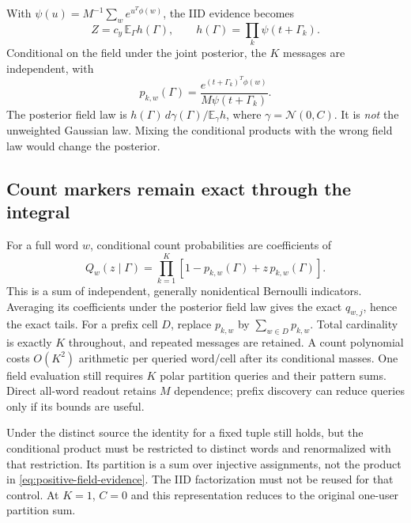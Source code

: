 \documentclass[10pt,a4paper]{article}
\newcommand{\E}{\mathbb E}
\begin{document}
With $\psi(u)=M^{-1}\sum_w e^{u^T\phi(w)}$, the IID evidence becomes
\begin{equation}
 Z=c_y\,\E_\Gamma h(\Gamma),\qquad
 h(\Gamma)=\prod_k\psi(t+\Gamma_k).
 \label{eq:positive-field-evidence}
\end{equation}
Conditional on the field under the joint posterior, the $K$ messages are independent, with
\[
 p_{k,w}(\Gamma)=\frac{e^{(t+\Gamma_k)^T\phi(w)}}{M\psi(t+\Gamma_k)}.
\]
The posterior field law is $h(\Gamma)\,d\gamma(\Gamma)/\E_\gamma h$, where $\gamma=\mathcal N(0,C)$.
It is \emph{not} the unweighted Gaussian law. Mixing the conditional products with the wrong field law
would change the posterior.

\subsection{Count markers remain exact through the integral}
For a full word $w$, conditional count probabilities are coefficients of
\begin{equation}
 Q_w(z\mid\Gamma)=\prod_{k=1}^K[1-p_{k,w}(\Gamma)+z\,p_{k,w}(\Gamma)].
 \label{eq:field-count-polynomial}
\end{equation}
This is a sum of independent, generally nonidentical Bernoulli indicators. Averaging its coefficients under
the posterior field law gives the exact $q_{w,j}$, hence the exact tails. For a prefix cell $D$, replace
$p_{k,w}$ by $\sum_{w\in D}p_{k,w}$. Total cardinality is exactly $K$ throughout, and repeated messages are
retained. A count polynomial costs $O(K^2)$ arithmetic per queried word/cell after its conditional masses.
One field evaluation still requires $K$ polar partition queries and their pattern sums. Direct all-word
readout retains $M$ dependence; prefix discovery can reduce queries only if its bounds are useful.

Under the distinct source the identity for a fixed tuple still holds, but the conditional product must be
restricted to distinct words and renormalized with that restriction. Its partition is a sum over injective
assignments, not the product in \eqref{eq:positive-field-evidence}. The IID factorization must not be reused
for that control. At $K=1$, $C=0$ and this representation reduces to the original one-user partition sum.

\newpage
\end{document}
